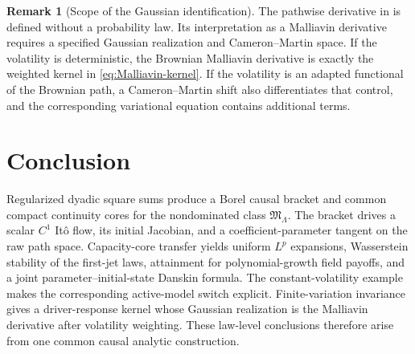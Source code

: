 \documentclass[11pt,reqno]{amsart}
\theoremstyle{plain}
\theoremstyle{definition}
\newtheorem{remark}[remark]{Remark}
\begin{document}
\begin{remark}[Scope of the Gaussian identification]
The pathwise derivative in  is defined without a
probability law.  Its interpretation as a Malliavin derivative requires a
specified Gaussian realization and Cameron--Martin space.  If the volatility
is deterministic, the Brownian Malliavin derivative is exactly the weighted
kernel in \eqref{eq:Malliavin-kernel}.  If the volatility is an adapted
functional of the Brownian path, a Cameron--Martin shift also differentiates
that control, and the corresponding variational equation contains additional
terms.
\end{remark}

\section{Conclusion}

Regularized dyadic square sums produce a Borel causal bracket and common
compact continuity cores for the nondominated class
\(\mathfrak M_\Lambda\).  The bracket drives a scalar \(C^1\) It\^o flow,
its initial Jacobian, and a coefficient-parameter tangent on the raw path
space.  Capacity-core transfer yields uniform \(L^p\) expansions,
Wasserstein stability of the first-jet laws, attainment for polynomial-growth
field payoffs, and a joint parameter--initial-state Danskin formula.
The constant-volatility example makes the corresponding active-model switch
explicit.
Finite-variation invariance gives a driver-response kernel whose Gaussian
realization is the Malliavin derivative after volatility weighting.  These
law-level conclusions therefore arise from one common causal analytic
construction.
\end{document}
